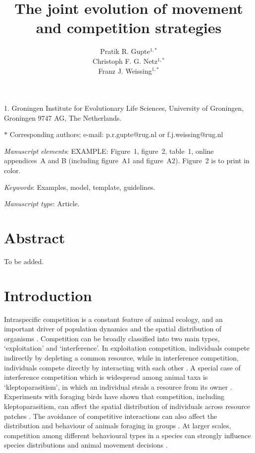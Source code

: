 \documentclass[11pt]{article}
\title{The joint evolution of movement and competition strategies}
\author{Pratik R. Gupte$^{1,\ast}$ \\ 
        Christoph F. G. Netz$^{1,\ast}$ \\ 
        Franz J. Weissing$^{1, \ast}$}
\date{}
\begin{document}
\maketitle

\noindent{} 1. Groningen Institute for Evolutionary Life Sciences, University of Groningen, Groningen 9747 AG, The Netherlands.

\noindent{} $\ast$ Corresponding authors; e-mail: p.r.gupte@rug.nl or f.j.weissing@rug.nl

\bigskip

\textit{Manuscript elements}: EXAMPLE: Figure~1, figure~2, table~1, online appendices~A and B (including figure~A1 and figure~A2). Figure~2 is to print in color.

\bigskip

\textit{Keywords}: Examples, model, template, guidelines.

\bigskip

\textit{Manuscript type}: Article. %

\bigskip


\linenumbers{}
\modulolinenumbers[1]

\newpage{}

\section{Abstract}

To be added.

\section{Introduction}

Intraspecific competition is a constant feature of animal ecology, and an important driver of population dynamics and the spatial distribution of organisms \citep{krebs1978}.
Competition can be broadly classified into two main types, `exploitation' and `interference'.
In exploitation competition, individuals compete indirectly by depleting a common resource, while in interference competition, individuals compete directly by interacting with each other \citep{birch1957,case1974,keddy2001}.
A special case of interference competition which is widespread among animal taxa is `kleptoparasitism', in which an individual steals a resource from its owner \citep{iyengar2008}.
Experiments with foraging birds have shown that competition, including kleptoparasitism, can affect the spatial distribution of individuals across resource patches \citep{goss-custard1980,vahl2005,vahl2005a,vahl2007,rutten2010}.
The avoidance of competitive interactions can also affect the distribution and behaviour of animals foraging in groups \citep{bijleveld2012a,rutten2010a}.
At larger scales, competition among different behavioural types in a species can strongly influence species distributions and animal movement decisions \citep[e.g.][]{duckworth2007,schlagel2020}.
\end{document}
